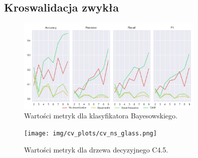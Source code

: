 \subsection*{Kroswalidacja zwykła}

\begin{figure}[H]
\center
    \includegraphics[width=0.8\textwidth]{img/cv_scores_kfold/scoring_kfold_glass.png}
    \caption{Wartości metryk dla klasyfikatora Bayesowskiego.}
\end{figure}

\begin{figure}[H]
    \center
    \texttt{[image: img/cv\_plots/cv\_ns\_glass.png]}
    \caption{Wartości metryk dla drzewa decyzyjnego C4.5.}
\end{figure}

